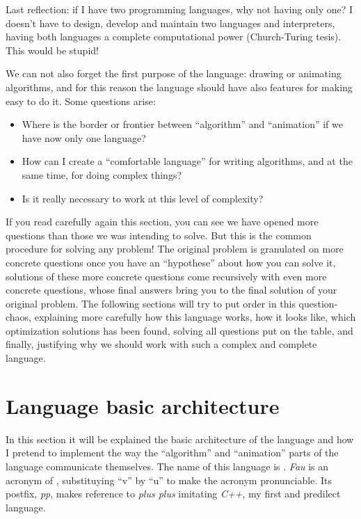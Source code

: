 \documentclass{article}
\begin{document}
Last reflection: if I have two programming languages, why not having only one?
I doesn't have to design, develop and maintain two languages and interpreters,
having both languages a complete computational power (Church-Turing tesis). This
would be stupid!

We can not also forget the first purpose of the language: drawing or animating
algorithms, and for this reason the language should have also features for
making easy to do it. Some questions arise:

\begin{itemize}
\item Where is the border or frontier between ``algorithm'' and ``animation'' if
  we have now only one language?
\item How can I create a ``comfortable language'' for writing algorithms, and at
  the same time, for doing complex things?
\item Is it really necessary to work at this level of complexity?
\end{itemize}

If you read carefully again this section, you can see we have opened more
questions than those we was intending to solve. But this is the common procedure
for solving any problem! The original problem is granulated on more concrete
questions once you have an ``hypothese'' about how you can solve it, solutions
of these more concrete questions come recursively with even more concrete
questions, whose final answers bring you to the final solution of your original
problem. The following sections will try to put order in this question-chaos,
explaining more carefully how this language works, how it looks like, which
optimization solutions has been found, solving all questions put on the table,
and finally, justifying why we should work with such a complex and complete
language.

\section{Language basic architecture}
In this section it will be explained the basic architecture of the language and
how I pretend to implement the way the ``algorithm'' and ``animation'' parts of
the language communicate themselves. The name of this language is
\faupp. \textit{Fau} is an acronym of \fav, substituying ``v'' by ``u'' to make
the acronym pronunciable. Its postfix, \textit{pp}, makes reference to
\textit{plus plus} imitating \textit{C++}, my first and predilect language.
\end{document}
